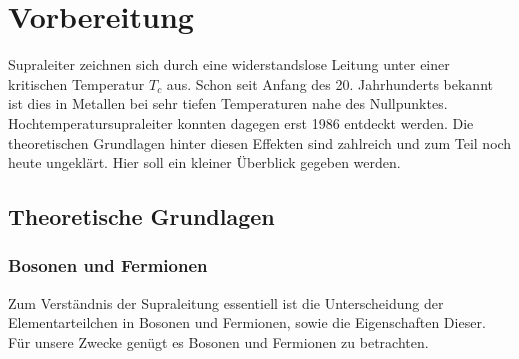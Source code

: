 \chapter{Vorbereitung}
Supraleiter zeichnen sich durch eine widerstandslose Leitung unter einer kritischen
Temperatur $T_c$ aus. Schon seit Anfang des 20. Jahrhunderts bekannt ist dies in
Metallen bei sehr tiefen Temperaturen nahe des Nullpunktes. Hochtemperatursupraleiter
konnten dagegen erst 1986 entdeckt werden. Die theoretischen Grundlagen hinter 
diesen Effekten sind zahlreich und zum Teil noch heute ungeklärt. Hier soll ein
kleiner Überblick gegeben werden.

	\section{Theoretische Grundlagen}

    \subsection{Bosonen und Fermionen}
Zum Verständnis der Supraleitung essentiell ist die Unterscheidung der 
Elementarteilchen in Bosonen und Fermionen, sowie die Eigenschaften Dieser.
Für unsere Zwecke genügt es Bosonen und Fermionen zu betrachten.

